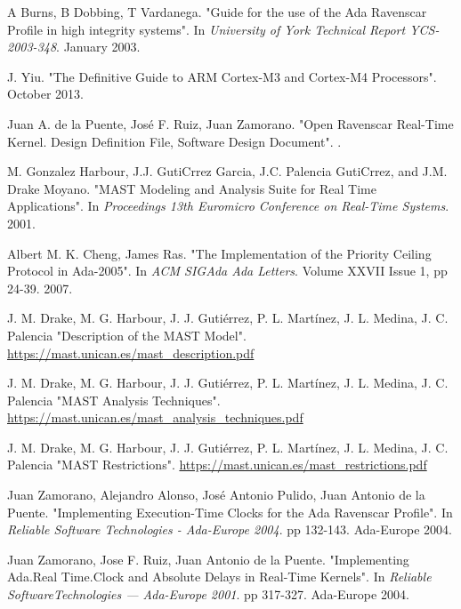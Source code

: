 \documentclass{article}
\begin{document}
\begin{thebibliography}{1}

A Burns, B Dobbing, T Vardanega.
\newblock "Guide for the use of the Ada Ravenscar Profile in high integrity systems".
\newblock In {\em University of York Technical Report YCS-2003-348}. January 2003.

J. Yiu.
\newblock "The Definitive Guide to ARM Cortex-M3 and Cortex-M4 Processors".
\newblock October 2013.

Juan A. de la Puente, José F. Ruiz, Juan Zamorano.
\newblock "Open Ravenscar Real-Time Kernel. Design Definition File, Software Design Document".
.

M. Gonzalez Harbour, J.J. GutiCrrez Garcia, J.C. Palencia GutiCrrez, and J.M. Drake Moyano.
\newblock "MAST Modeling and Analysis Suite for Real Time Applications".
\newblock In {\em Proceedings 13th Euromicro Conference on Real-Time Systems}. 2001.

Albert M. K. Cheng, James Ras.
\newblock "The Implementation of the Priority Ceiling Protocol in Ada-2005".
\newblock In {\em ACM SIGAda Ada Letters}. Volume XXVII Issue 1, pp 24-39. 2007.

J. M. Drake, M. G. Harbour, J. J. Gutiérrez, P. L. Martínez, J. L. Medina, J. C. Palencia
\newblock "Description of the MAST Model".
\newblock \url{https://mast.unican.es/mast_description.pdf}

J. M. Drake, M. G. Harbour, J. J. Gutiérrez, P. L. Martínez, J. L. Medina, J. C. Palencia
\newblock "MAST Analysis Techniques".
\newblock \url{https://mast.unican.es/mast_analysis_techniques.pdf}

J. M. Drake, M. G. Harbour, J. J. Gutiérrez, P. L. Martínez, J. L. Medina, J. C. Palencia
\newblock "MAST Restrictions".
\newblock \url{https://mast.unican.es/mast_restrictions.pdf}

Juan Zamorano, Alejandro Alonso, José Antonio Pulido, Juan Antonio de la Puente.
\newblock "Implementing Execution-Time Clocks for the Ada Ravenscar Profile".
\newblock In {\em Reliable Software Technologies - Ada-Europe 2004}. pp 132-143. Ada-Europe 2004.

Juan Zamorano, Jose F. Ruiz, Juan Antonio de la Puente.
\newblock "Implementing Ada.Real Time.Clock and Absolute Delays in Real-Time Kernels".
\newblock In {\em Reliable SoftwareTechnologies — Ada-Europe 2001}. pp 317-327. Ada-Europe 2004.


\end{thebibliography}
\end{document}
